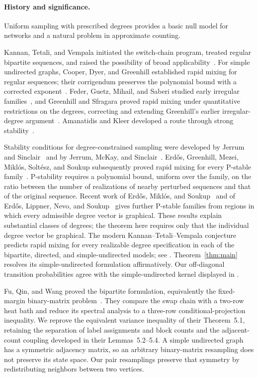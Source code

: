 \paragraph{History and significance.}
Uniform sampling with prescribed degrees provides a basic null model
for networks and a natural problem in approximate counting.

Kannan, Tetali, and Vempala initiated the switch-chain program, treated
regular bipartite sequences, and raised the possibility of broad
applicability~\cite{KTV99}. For simple undirected graphs, Cooper, Dyer,
and Greenhill established rapid mixing for regular sequences; their
corrigendum preserves the polynomial bound with a corrected
exponent~\cite{CDG07,CDG12}. Feder, Guetz, Mihail, and Saberi studied
early irregular families~\cite{FGMS06}, and Greenhill and Sfragara
proved rapid mixing under quantitative restrictions on the degrees,
correcting and extending Greenhill's earlier irregular-degree
argument~\cite{Greenhill15,GS18}. Amanatidis and Kleer developed a route through
strong stability~\cite{AK20}.

Stability conditions for degree-constrained sampling were developed by
Jerrum and Sinclair~\cite{JS90} and by Jerrum, McKay, and
Sinclair~\cite{JMS92}. Erd\H{o}s, Greenhill, Mezei, Mikl\'os,
Solt\'esz, and Soukup subsequently
proved rapid mixing for every P-stable family~\cite{Unified22}.
P-stability requires a polynomial bound, uniform over the family, on
the ratio between the number of realizations of nearby perturbed
sequences and that of the original sequence. Recent work of
Erd\H{o}s, Mikl\'os, and Soukup~\cite{EMS25} and of Erd\H{o}s, Lippner,
Nevo, and Soukup~\cite{ELNS25} gives further P-stable families from
regions in which every admissible degree vector is graphical.
These results explain substantial classes of degrees; the theorem
here requires only that the individual degree vector be graphical.
The modern Kannan--Tetali--Vempala conjecture predicts rapid mixing
for every realizable degree specification in each of the bipartite, directed, and
simple-undirected models; see \cite[Conjecture~1.1]{Unified22}.
Theorem~\ref{thm:main} resolves its simple-undirected formulation
affirmatively. Our off-diagonal transition probabilities agree with
the simple-undirected kernel displayed in
\cite[Equation~(3.1)]{Unified22}.

Fu, Qin, and Wang proved the bipartite formulation, equivalently the
fixed-margin binary-matrix problem~\cite{FQW26}. They compare the
swap chain with a two-row heat bath and reduce its spectral analysis
to a three-row conditional-projection inequality. We reprove the
equivalent variance inequality of their Theorem~5.1, retaining the
separation of label assignments and block counts and the adjacent-count
coupling developed in their Lemmas~5.2--5.4. A simple undirected graph
has a symmetric adjacency matrix, so an arbitrary binary-matrix
resampling does not preserve its state space. Our pair resamplings
preserve that symmetry by redistributing neighbors between two vertices.

